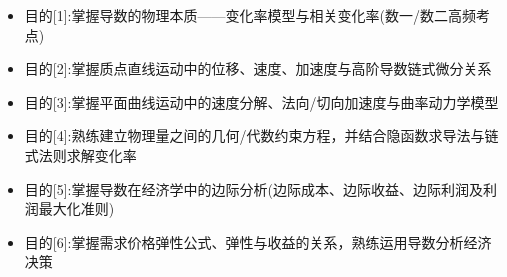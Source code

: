 \documentclass[11pt,a4paper,UTF8]{ctexart}
\begin{document}
\pagestyle{fancy}
\fancyhf{}
\fancyhead[R]{\small\color{TitlePurple}\nouppercase{\leftmark}}
\renewcommand{\headrulewidth}{0.5pt}

\tableofcontents
\newpage
{}


\begin{targetbox}[本章复习目标与核心知识图谱]
\begin{itemize}
  \item 目的[1]:掌握导数的物理本质——变化率模型与相关变化率(数一/数二高频考点)
\end{itemize}
\end{targetbox}

\begin{targetbox}[本章复习目标与核心知识图谱]
\begin{itemize}
  \item 目的[2]:掌握质点直线运动中的位移、速度、加速度与高阶导数链式微分关系
\end{itemize}
\end{targetbox}

\begin{targetbox}[本章复习目标与核心知识图谱]
\begin{itemize}
  \item 目的[3]:掌握平面曲线运动中的速度分解、法向/切向加速度与曲率动力学模型
\end{itemize}
\end{targetbox}

\begin{targetbox}[本章复习目标与核心知识图谱]
\begin{itemize}
  \item 目的[4]:熟练建立物理量之间的几何/代数约束方程，并结合隐函数求导法与链式法则求解变化率
\end{itemize}
\end{targetbox}

\begin{targetbox}[本章复习目标与核心知识图谱]
\begin{itemize}
  \item 目的[5]:掌握导数在经济学中的边际分析(边际成本、边际收益、边际利润及利润最大化准则)
\end{itemize}
\end{targetbox}

\begin{targetbox}[本章复习目标与核心知识图谱]
\begin{itemize}
  \item 目的[6]:掌握需求价格弹性公式、弹性与收益的关系，熟练运用导数分析经济决策
\end{itemize}
\end{targetbox}
\end{document}
